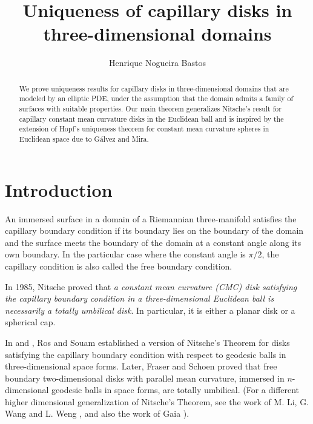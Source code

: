 \documentclass[11pt,reqno]{amsart}
\title{Uniqueness of capillary disks in three-dimensional domains}
\author{Henrique Nogueira Bastos}
\begin{document}
\begin{abstract}
We prove uniqueness results for capillary disks in three-dimensional domains that are modeled by an elliptic PDE, under the assumption that the domain admits a family of surfaces with suitable properties. Our main theorem generalizes Nitsche's result for capillary constant mean curvature disks in the Euclidean ball and is inspired by the extension of Hopf's uniqueness theorem for constant mean curvature spheres in Euclidean space due to Gálvez and Mira.
\end{abstract}


\maketitle

\section{Introduction}

 An immersed surface in a domain of a Riemannian three-manifold satisfies the capillary boundary condition if its boundary lies on the boundary of the domain and the surface meets the boundary of the domain at a constant angle along its own boundary. In the particular case where the constant angle is $\pi/2$, the capillary condition is also called the free boundary condition.
 
 In 1985, Nitsche \cite{Nitsche} proved that \textit{a constant mean curvature (CMC) disk satisfying the capillary boundary condition in a three-dimensional Euclidean ball is necessarily a totally umbilical disk}. In particular, it is either a planar disk or a spherical cap.

In \cite{Souam} and \cite{Ros-Souam-1997}, Ros and Souam established a version of Nitsche's Theorem for disks satisfying the capillary boundary condition with respect to geodesic balls in three-dimensional space forms. Later, Fraser and Schoen \cite{Fraser-Schoen-Uniqueness-Disks} proved that free boundary two-dimensional disks with parallel mean curvature, immersed in $n$-dimensional geodesic balls in space forms, are totally umbilical. (For a different higher dimensional generalization of Nitsche's Theorem, see the work of M. Li, G. Wang and L. Weng \cite{LiWanWen}, and also the work of Gaia \cite{Gai}).
\end{document}
